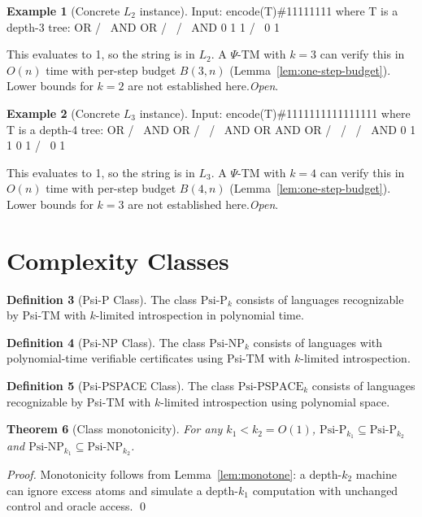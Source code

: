\documentclass[11pt]{article}
\newtheorem{theorem}{Theorem}[section]
\theoremstyle{definition}
\newtheorem{definition}[theorem]{Definition}
\newtheorem{example}[theorem]{Example}
\newcommand{\PSi}{\Psi}
\begin{document}
\begin{example}[Concrete $L_2$ instance]
Input: encode(T)\#11111111 where T is a depth-3 tree:
        OR
       /  \
      AND  OR
     /  \  / \
    AND  0 1  1
   /  \
  0    1

This evaluates to 1, so the string is in $L_2$.
A $\PSi$-TM with $k=3$ can verify this in $O(n)$ time with per-step budget $B(3,n)$ (Lemma~\ref{lem:one-step-budget}). Lower bounds for $k=2$ are not established here.\;\emph{Open}.
\end{example}

\begin{example}[Concrete $L_3$ instance]
Input: encode(T)\#1111111111111111 where T is a depth-4 tree:
         OR
        /  \
       AND  OR
      /  \  / \
     AND  OR AND OR
    /  \  / \  / \
   AND  0 1  1 0  1
  /  \
 0    1

This evaluates to 1, so the string is in $L_3$.
A $\PSi$-TM with $k=4$ can verify this in $O(n)$ time with per-step budget $B(4,n)$ (Lemma~\ref{lem:one-step-budget}). Lower bounds for $k=3$ are not established here.\;\emph{Open}.
\end{example}

\section{Complexity Classes}

\begin{definition}[Psi-P Class]
The class $\text{Psi-P}_k$ consists of languages recognizable by Psi-TM with $k$-limited introspection in polynomial time.
\end{definition}

\begin{definition}[Psi-NP Class]
The class $\text{Psi-NP}_k$ consists of languages with polynomial-time verifiable certificates using Psi-TM with $k$-limited introspection.
\end{definition}

\begin{definition}[Psi-PSPACE Class]
The class $\text{Psi-PSPACE}_k$ consists of languages recognizable by Psi-TM with $k$-limited introspection using polynomial space.
\end{definition}

\begin{theorem}[Class monotonicity]
For any $k_1 < k_2 = O(1)$, $\text{Psi-P}_{k_1} \subseteq \text{Psi-P}_{k_2}$ and $\text{Psi-NP}_{k_1} \subseteq \text{Psi-NP}_{k_2}$.
\end{theorem}
\begin{proof}
Monotonicity follows from Lemma~\ref{lem:monotone}: a depth-$k_2$ machine can ignore excess atoms and simulate a depth-$k_1$ computation with unchanged control and oracle access. \qed
\end{proof}
\end{document}
